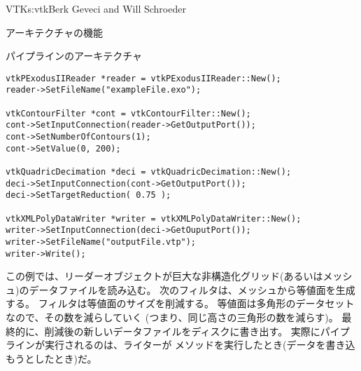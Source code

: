 \begin{aosachapter}{VTK}{s:vtk}{Berk Geveci and Will Schroeder}
\begin{aosasect1}{アーキテクチャの機能}
\begin{aosasect2}{パイプラインのアーキテクチャ}
\begin{verbatim}
vtkPExodusIIReader *reader = vtkPExodusIIReader::New();
reader->SetFileName("exampleFile.exo");

vtkContourFilter *cont = vtkContourFilter::New();
cont->SetInputConnection(reader->GetOutputPort());
cont->SetNumberOfContours(1);
cont->SetValue(0, 200);

vtkQuadricDecimation *deci = vtkQuadricDecimation::New();
deci->SetInputConnection(cont->GetOutputPort());
deci->SetTargetReduction( 0.75 );

vtkXMLPolyDataWriter *writer = vtkXMLPolyDataWriter::New();
writer->SetInputConnection(deci->GetOuputPort());
writer->SetFileName("outputFile.vtp");
writer->Write();
\end{verbatim}

\noindent
この例では、リーダーオブジェクトが巨大な非構造化グリッド(あるいはメッシュ)のデータファイルを読み込む。
次のフィルタは、メッシュから等値面を生成する。
フィルタは等値面のサイズを削減する。
等値面は多角形のデータセットなので、その数を減らしていく
(つまり、同じ高さの三角形の数を減らす)。
最終的に、削減後の新しいデータファイルをディスクに書き出す。
実際にパイプラインが実行されるのは、ライターが
メソッドを実行したとき(データを書き込もうとしたとき)だ。


\end{aosasect2}
\end{aosasect1}
\end{aosachapter}
